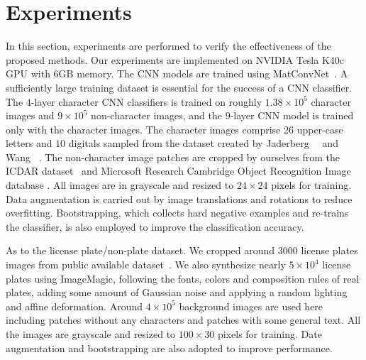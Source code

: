 \documentclass[twocolumn]{svjour3}
\begin{document}
\section{Experiments}\label{SEC:Exp}
In this section, experiments are performed to verify the effectiveness of the proposed methods. %
Our experiments are implemented on NVIDIA Tesla K$40$c GPU with $6$GB memory.
The CNN models are trained using MatConvNet~\cite{vedaldi15matconvnet}.
A sufficiently large training dataset is essential for the success of a CNN classifier. The $4$-layer character CNN classifiers is trained on roughly $1.38 \times 10^5$ character images and $9 \times 10^5$ non-character images, and the $9$-layer CNN model is trained only with the character images.  The character images comprise $26$ upper-case letters and $10$ digitals sampled from the dataset created by Jaderberg~\etal~\cite{Max2014ECCV} and Wang \etal~\cite{Wangkai2011}. The non-character image patches are cropped by ourselves from the ICDAR dataset~\cite{icdar2003,icdar2005,icdar2011} and Microsoft Research Cambridge Object Recognition Image database \cite{msrcorid}. All images are in grayscale and resized to $24 \times 24$ pixels for training. Data augmentation is carried out by image translations and rotations to reduce overfitting. Bootstrapping, which collects hard negative examples and re-trains the classifier, is also employed to improve the classification accuracy.

As to the license plate/non-plate dataset. We cropped around $3000$ license plates images from public available dataset~\cite{Zhou2012Principal,Cnagnost2008}. We also synthesize nearly $5 \times 10^4$ license plates using ImageMagic, following the fonts, colors and composition rules of real plates, adding some amount of Gaussian noise and applying a random lighting and affine deformation. Around $4 \times 10^5$ background images are used here including patches without any characters and patches with some general text. All the images are grayscale and resized to $100 \times 30$ pixels for training. Date augmentation and bootstrapping are also adopted to improve performance.
\end{document}
